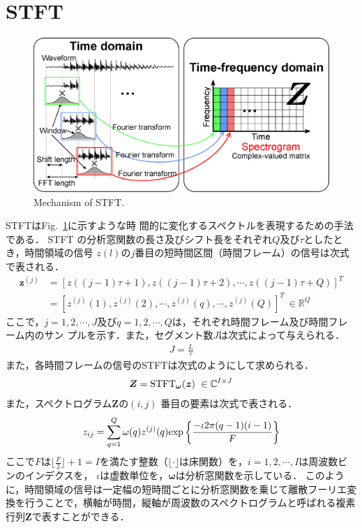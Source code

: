 \section{STFT}
\label{sec:stft}
\begin{figure}[t]
    \begin{center}
        \includegraphics[width=0.95\columnwidth]{figures/stft.eps}
    \end{center}
    \vspace{-8pt}
	\caption{Mechanism of STFT.}
	\label{fig:stft}
\end{figure}
STFTはFig.~\ref{fig:stft}に示すような時
間的に変化するスペクトルを表現するための手法である．
STFT の分析窓関数の長さ及びシフト長をそれぞれ$Q$及び$\tau$としたとき，時間領域の信号
$z(l)$の$j$番目の短時間区間（時間フレーム）の信号は次式で表される．
\begin{align}
    \bm{z}^{(j)} &= \left[z\left((j-1)\tau+1\right), z\left((j-1)\tau+2\right), \cdots , z\left((j-1)\tau+Q\right) \right]^{T}\\
    &= \left[
    z^{(j)}(1),z^{(j)}(2),\cdots , z^{(j)}(q), \cdots , z^{(j)}(Q)
    \right]^{T}~\in \mathbb{R}^{Q}
\end{align}
ここで，$j= 1, 2, \cdots , J$及び$q= 1, 2, \cdots , Q$は，それぞれ時間フレーム及び時間フレーム内のサン
プルを示す．また，セグメント数$J$は次式によって与えられる．
\begin{align}
    J = \frac{L}{\tau}
\end{align}
また，各時間フレームの信号のSTFTは次式のようにして求められる．
\begin{align}
\bm{Z}= {\rm STFT}_{\bm{\omega}}(\bm{z})~\in \mathbb{C}^{I \times J}
\end{align}
また，スペクトログラム$\bm{Z}$の$(i, j)$ 番目の要素は次式で表される．
\begin{align}
    z_{ij}= \sum_{q=1}^{Q}\omega(q)z^{(j)}(q){\rm exp}\left\{\frac{-\iota2\pi(q-1)(i-1)}{F}\right\}
\end{align}
ここで$F$は$\lfloor \frac{F}{2}\rfloor+1 =I$を満たす整数（$\lfloor \cdot \rfloor$は床関数）を，$i= 1, 2, \cdots , I$は周波数ビンのインデクスを，
$\iota$は虚数単位を，$\bm{\omega}$は分析窓関数を示している．
このように，時間領域の信号は一定幅の短時間ごとに分析窓関数を乗じて離散フーリエ変換を行うことで，横軸が時間，縦軸が周波数のスペクトログラムと呼ばれる複素行列$\bm{Z}$で表すことができる．

